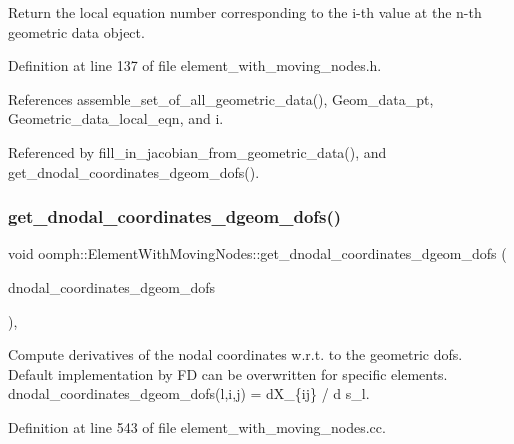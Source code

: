 Return the local equation number corresponding to the i-\/th value at the n-\/th geometric data object. 



Definition at line 137 of file element\+\_\+with\+\_\+moving\+\_\+nodes.\+h.



References assemble\+\_\+set\+\_\+of\+\_\+all\+\_\+geometric\+\_\+data(), Geom\+\_\+data\+\_\+pt, Geometric\+\_\+data\+\_\+local\+\_\+eqn, and i.



Referenced by fill\+\_\+in\+\_\+jacobian\+\_\+from\+\_\+geometric\+\_\+data(), and get\+\_\+dnodal\+\_\+coordinates\+\_\+dgeom\+\_\+dofs().

\mbox{\label{classoomph_1_1ElementWithMovingNodes_a639f9c0e3cf3a8173497011e8a496750}} 
\subsubsection{\texorpdfstring{get\+\_\+dnodal\+\_\+coordinates\+\_\+dgeom\+\_\+dofs()}{get\_dnodal\_coordinates\_dgeom\_dofs()}}
{\footnotesize\ttfamily void oomph\+::\+Element\+With\+Moving\+Nodes\+::get\+\_\+dnodal\+\_\+coordinates\+\_\+dgeom\+\_\+dofs (\begin{DoxyParamCaption}\item[{\hyperlink{classoomph_1_1RankThreeTensor}{Rank\+Three\+Tensor}$<$ double $>$ \&}]{dnodal\+\_\+coordinates\+\_\+dgeom\+\_\+dofs }\end{DoxyParamCaption})\hspace{0.3cm}{\ttfamily [protected]}, {\ttfamily [virtual]}}



Compute derivatives of the nodal coordinates w.\+r.\+t. to the geometric dofs. Default implementation by FD can be overwritten for specific elements. dnodal\+\_\+coordinates\+\_\+dgeom\+\_\+dofs(l,i,j) = d\+X\+\_\+\{ij\} / d s\+\_\+l. 



Definition at line 543 of file element\+\_\+with\+\_\+moving\+\_\+nodes.\+cc.




